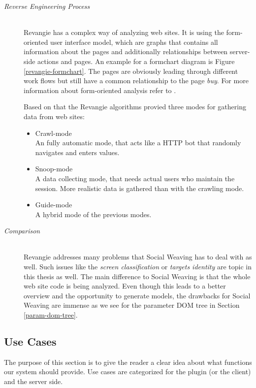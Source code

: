 \begin{enumerate}[A.]
	\begin{description}
		\item[\emph{Reverse Engineering Process}]\mbox{}\\ 
		Revangie has a complex way of analyzing web sites. It is using the form-oriented user interface model, which are graphs that contains all information about the pages and additionally relationships between server-side actions and pages. An example for a formchart diagram is Figure \ref{revangie-formchart}. The pages are obviously leading through different work flows but still have a common relationship to the page \emph{buy}. For more information about form-oriented analysis refer to \cite{draheim2005form}. 
		
		Based on that the Revangie algorithms provied three modes for gathering data from web sites:
		\begin{itemize}
			\item Crawl-mode\\
				An fully automatic mode, that acts like a HTTP bot that randomly navigates and enters values.
			\item Snoop-mode\\
				A data collecting mode, that needs actual users who maintain the session. More realistic data is gathered than with the crawling mode. 		
			\item Guide-mode\\
				A hybrid mode of the previous modes. 
		\end{itemize}
		
		\item[\emph{Comparison}]\mbox{}\\
		Revangie addresses many problems that Social Weaving has to deal with as well. Such issues like the \emph{screen classification} or \emph{targets identity} are topic in this thesis as well. The main difference to Social Weaving is that the whole web site code is being analyzed. Even though this leads to a better overview and the opportunity to generate models, the drawbacks for Social Weaving are immense as we see for the parameter DOM tree in Section \ref{param-dom-tree}.		
	\end{description}
\end{enumerate}

\newpage

\subsection{Use Cases}
The purpose of this section is to give the reader a clear idea about what functions our system should provide. Use cases are categorized for the plugin (or the client) and the server side. 

